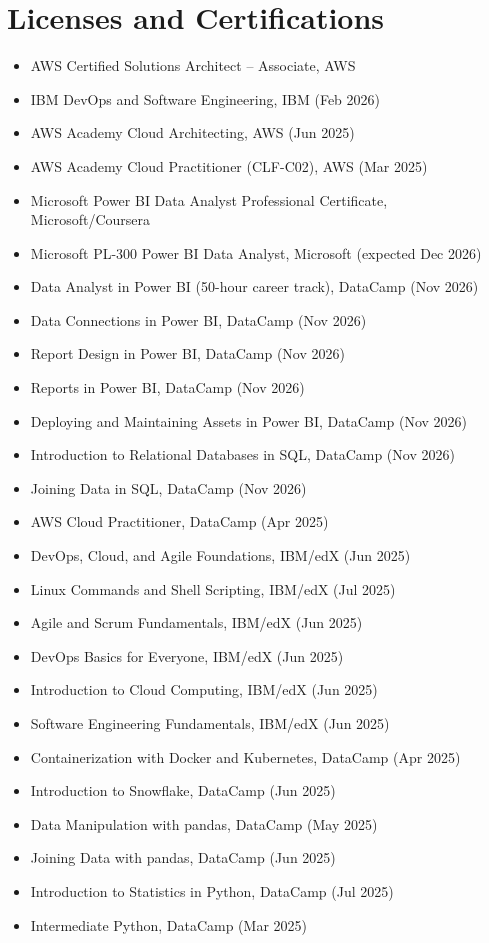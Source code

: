 \documentclass[a4paper,10pt]{article}
\begin{document}
\section*{Licenses and Certifications}
\begin{itemize}
  \item AWS Certified Solutions Architect -- Associate, AWS
  \item IBM DevOps and Software Engineering, IBM (Feb 2026)
  \item AWS Academy Cloud Architecting, AWS (Jun 2025)
  \item AWS Academy Cloud Practitioner (CLF-C02), AWS (Mar 2025)
  \item Microsoft Power BI Data Analyst Professional Certificate, Microsoft/Coursera
  \item Microsoft PL-300 Power BI Data Analyst, Microsoft (expected Dec 2026)
  \item Data Analyst in Power BI (50-hour career track), DataCamp (Nov 2026)
  \item Data Connections in Power BI, DataCamp (Nov 2026)
  \item Report Design in Power BI, DataCamp (Nov 2026)
  \item Reports in Power BI, DataCamp (Nov 2026)
  \item Deploying and Maintaining Assets in Power BI, DataCamp (Nov 2026)
  \item Introduction to Relational Databases in SQL, DataCamp (Nov 2026)
  \item Joining Data in SQL, DataCamp (Nov 2026)
  \item AWS Cloud Practitioner, DataCamp (Apr 2025)
  \item DevOps, Cloud, and Agile Foundations, IBM/edX (Jun 2025)
  \item Linux Commands and Shell Scripting, IBM/edX (Jul 2025)
  \item Agile and Scrum Fundamentals, IBM/edX (Jun 2025)
  \item DevOps Basics for Everyone, IBM/edX (Jun 2025)
  \item Introduction to Cloud Computing, IBM/edX (Jun 2025)
  \item Software Engineering Fundamentals, IBM/edX (Jun 2025)
  \item Containerization with Docker and Kubernetes, DataCamp (Apr 2025)
  \item Introduction to Snowflake, DataCamp (Jun 2025)
  \item Data Manipulation with pandas, DataCamp (May 2025)
  \item Joining Data with pandas, DataCamp (Jun 2025)
  \item Introduction to Statistics in Python, DataCamp (Jul 2025)
  \item Intermediate Python, DataCamp (Mar 2025)
\end{itemize}
\end{document}
